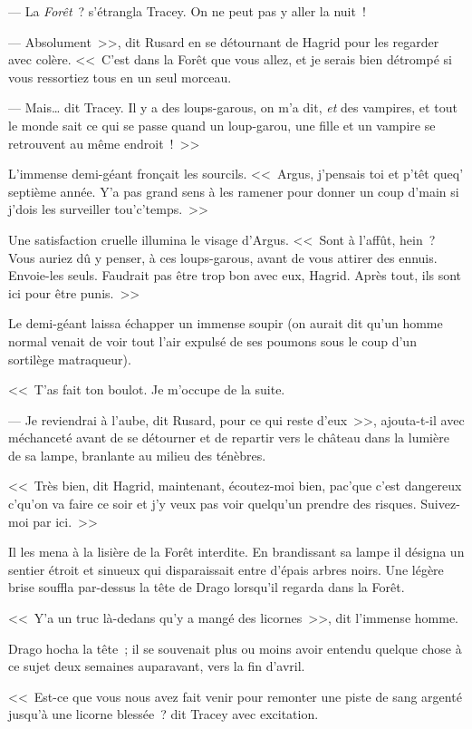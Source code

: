 --- La \emph{Forêt}~? s'étrangla Tracey. On ne peut pas y aller la nuit~!

--- Absolument~>>, dit Rusard en se détournant de Hagrid pour les regarder avec colère. <<~C'est dans la Forêt que vous allez, et je serais bien détrompé si vous ressortiez tous en un seul morceau.

--- Mais… dit Tracey. Il y a des loups-garous, on m'a dit, \emph{et} des vampires, et tout le monde sait ce qui se passe quand un loup-garou, une fille et un vampire se retrouvent au même endroit~!~>>

L'immense demi-géant fronçait les sourcils. <<~Argus, j'pensais toi et p'têt queq' septième année. Y'a pas grand sens à les ramener pour donner un coup d'main si j'dois les surveiller tou'c'temps.~>>

Une satisfaction cruelle illumina le visage d'Argus. <<~Sont à l'affût, hein~? Vous auriez dû y penser, à ces loups-garous, avant de vous attirer des ennuis. Envoie-les seuls. Faudrait pas être trop bon avec eux, Hagrid. Après tout, ils sont ici pour être punis.~>>

Le demi-géant laissa échapper un immense soupir (on aurait dit qu'un homme normal venait de voir tout l'air expulsé de ses poumons sous le coup d'un sortilège matraqueur).

<<~T'as fait ton boulot. Je m'occupe de la suite.

--- Je reviendrai à l'aube, dit Rusard, pour ce qui reste d'eux~>>, ajouta-t-il avec méchanceté avant de se détourner et de repartir vers le château dans la lumière de sa lampe, branlante au milieu des ténèbres.

<<~Très bien, dit Hagrid, maintenant, écoutez-moi bien, pac'que c'est dangereux c'qu'on va faire ce soir et j'y veux pas voir quelqu'un prendre des risques. Suivez-moi par ici.~>>

Il les mena à la lisière de la Forêt interdite. En brandissant sa lampe il désigna un sentier étroit et sinueux qui disparaissait entre d'épais arbres noirs. Une légère brise souffla par-dessus la tête de Drago lorsqu'il regarda dans la Forêt.

<<~Y'a un truc là-dedans qu'y a mangé des licornes~>>, dit l'immense homme.

Drago hocha la tête~; il se souvenait plus ou moins avoir entendu quelque chose à ce sujet deux semaines auparavant, vers la fin d'avril.

<<~Est-ce que vous nous avez fait venir pour remonter une piste de sang argenté jusqu'à une licorne blessée~? dit Tracey avec excitation.

